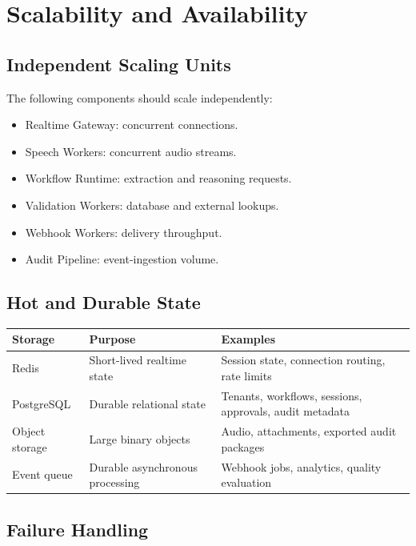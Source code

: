 \documentclass[11pt,a4paper]{article}
\begin{document}
\section{Scalability and Availability}

\subsection{Independent Scaling Units}

The following components should scale independently:

\begin{itemize}
\item Realtime Gateway: concurrent connections.
\item Speech Workers: concurrent audio streams.
\item Workflow Runtime: extraction and reasoning requests.
\item Validation Workers: database and external lookups.
\item Webhook Workers: delivery throughput.
\item Audit Pipeline: event-ingestion volume.
\end{itemize}

\subsection{Hot and Durable State}

\begin{tabularx}{\textwidth}{L{35mm}Y Y}
\toprule
\textbf{Storage} & \textbf{Purpose} & \textbf{Examples} \\
\midrule
Redis
& Short-lived realtime state
& Session state, connection routing, rate limits \\

PostgreSQL
& Durable relational state
& Tenants, workflows, sessions, approvals, audit metadata \\

Object storage
& Large binary objects
& Audio, attachments, exported audit packages \\

Event queue
& Durable asynchronous processing
& Webhook jobs, analytics, quality evaluation \\
\bottomrule
\end{tabularx}

\subsection{Failure Handling}
\end{document}
